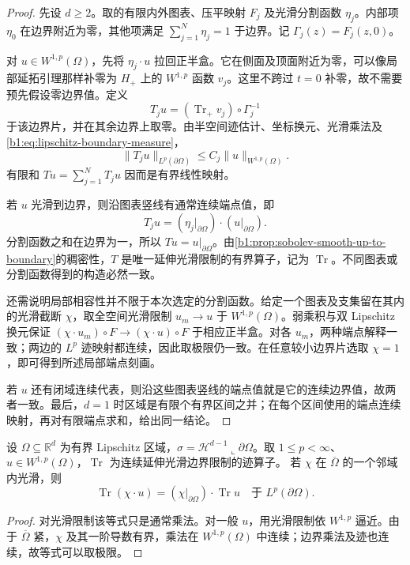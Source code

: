 \begin{proof}
先设 \(d\ge2\)。取的有限内外图表、压平映射 \(F_j\) 及光滑分割函数 \(\eta_j\)。内部项 \(\eta_0\) 在边界附近为零，其他项满足 \(\sum_{j=1}^N\eta_j=1\) 于边界。记 \(\Gamma_j(z)=F_j(z,0)\)。

对 \(u\in W^{1,p}(\Omega)\)，先将 \(\eta_j\cdot u\) 拉回正半盒。它在侧面及顶面附近为零，可以像局部延拓引理那样补零为 \(H_+\) 上的 \(W^{1,p}\) 函数 \(v_j\)。这里不跨过 \(t=0\) 补零，故不需要预先假设零边界值。定义
\[
 T_ju=(\operatorname{Tr}_+v_j)\circ\Gamma_j^{-1}
\]
于该边界片，并在其余边界上取零。由半空间迹估计、坐标换元、光滑乘法及\eqref{b1:eq:lipschitz-boundary-measure}，
\[
 \|T_ju\|_{L^p(\partial\Omega)}
 \le C_j\|u\|_{W^{1,p}(\Omega)}.
\]
有限和 \(Tu=\sum_{j=1}^N T_ju\) 因而是有界线性映射。

若 \(u\) 光滑到边界，则沿图表竖线有通常连续端点值，即
\[
 T_ju=(\eta_j|_{\partial\Omega})\cdot(u|_{\partial\Omega}).
\]
分割函数之和在边界为一，所以 \(Tu=u|_{\partial\Omega}\)。由\cref{b1:prop:sobolev-smooth-up-to-boundary}的稠密性，\(T\) 是唯一延伸光滑限制的有界算子，记为 \(\operatorname{Tr}\)。不同图表或分割函数得到的构造必然一致。

还需说明局部相容性并不限于本次选定的分割函数。给定一个图表及支集留在其内的光滑截断 \(\chi\)，取全空间光滑限制 \(u_m\to u\) 于 \(W^{1,p}(\Omega)\)。弱乘积与双 Lipschitz 换元保证 \((\chi\cdot u_m)\circ F\to(\chi\cdot u)\circ F\) 于相应正半盒。对各 \(u_m\)，两种端点解释一致；两边的 \(L^p\) 迹映射都连续，因此取极限仍一致。在任意较小边界片选取 \(\chi=1\)，即可得到所述局部端点刻画。

若 \(u\) 还有闭域连续代表，则沿这些图表竖线的端点值就是它的连续边界值，故两者一致。最后，\(d=1\) 时区域是有限个有界区间之并；在每个区间使用的端点连续映射，再对有限端点求和，给出同一结论。
\end{proof}

\begin{proposition}\label{b1:prop:trace-multiplication}
设 \(\Omega\subseteq\mathbb R^d\) 为有界 Lipschitz 区域，\(\sigma=\mathcal H^{d-1}\llcorner\partial\Omega\)。取 \(1\leq p<\infty\)、\(u\in W^{1,p}(\Omega)\)，\(\operatorname{Tr}\) 为连续延伸光滑边界限制的迹算子。
若 \(\chi\) 在 \(\overline\Omega\) 的一个邻域内光滑，则
\[
 \operatorname{Tr}(\chi\cdot u)
 =(\chi|_{\partial\Omega})\cdot\operatorname{Tr}u
 \quad\text{于 }L^p(\partial\Omega).
\]
\end{proposition}
\begin{proof}
对光滑限制该等式只是通常乘法。对一般 \(u\)，用光滑限制依 \(W^{1,p}\) 逼近。由于 \(\overline\Omega\) 紧，\(\chi\) 及其一阶导数有界，乘法在 \(W^{1,p}(\Omega)\) 中连续；边界乘法及迹也连续，故等式可以取极限。
\end{proof}

